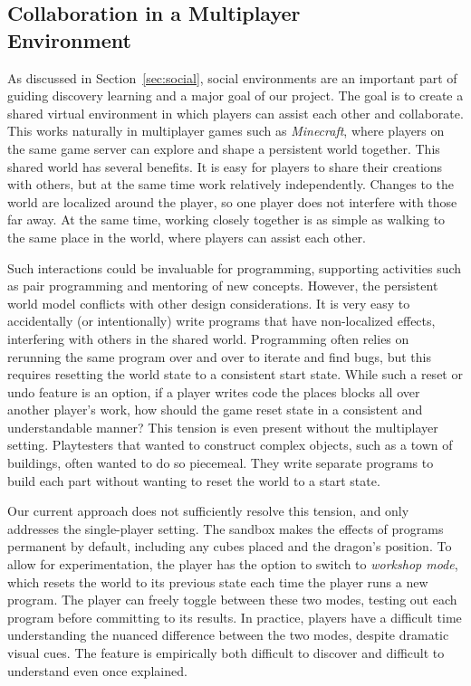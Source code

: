 \documentclass{sig-alternate}
\begin{document}
\subsection{Collaboration in a Multiplayer\\Environment}
\label{sec:multiplayer}

As discussed in Section~\ref{sec:social}, social environments are an important part of guiding discovery learning and a major goal of our project.
The goal is to create a shared virtual environment in which players can assist each other and collaborate.
This works naturally in multiplayer games such as \emph{Minecraft}, where players on the same game server can explore and shape a persistent world together.
This shared world has several benefits.
It is easy for players to share their creations with others, but at the same time work relatively independently.
Changes to the world are localized around the player, so one player does not interfere with those far away.
At the same time, working closely together is as simple as walking to the same place in the world, where players can assist each other.

Such interactions could be invaluable for programming, supporting activities such as pair programming and mentoring of new concepts.
However, the persistent world model conflicts with other design considerations.
It is very easy to accidentally (or intentionally) write programs that have non-localized effects, interfering with others in the shared world.
Programming often relies on rerunning the same program over and over to iterate and find bugs, but this requires resetting the world state to a consistent start state.
While such a reset or undo feature is an option, if a player writes code the places blocks all over another player's work, how should the game reset state in a consistent and understandable manner?
This tension is even present without the multiplayer setting.
Playtesters that wanted to construct complex objects, such as a town of buildings, often wanted to do so piecemeal. They write separate programs to build each part without wanting to reset the world to a start state.

Our current approach does not sufficiently resolve this tension, and only addresses the single-player setting.
The sandbox makes the effects of programs permanent by default, including any cubes placed and the dragon's position.
To allow for experimentation, the player has the option to switch to \emph{workshop mode}, which resets the world to its previous state each time the player runs a new program. 
The player can freely toggle between these two modes, testing out each program before committing to its results. 
In practice, players have a difficult time understanding the nuanced difference between the two modes, despite dramatic visual cues.
The feature is empirically both difficult to discover and difficult to understand even once explained.
\end{document}
